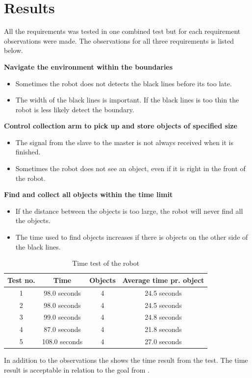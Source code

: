 \section{Results}

All the requirements was tested in one combined test but for each requirement observations were made. The observations for all three requirements is listed below.

\textbf{Navigate the environment within the boundaries}
\begin{itemize}
\item Sometimes the robot does not detects the black lines before its too late.
\item The width of the black lines is important. If the black lines is too thin the robot is less likely detect the boundary.
\end{itemize}

\textbf{Control collection arm to pick up and store objects of specified size}
\begin{itemize}
\item The signal from the slave to the master is not always received when it is finished.
\item Sometimes the robot does not see an object, even if it is right in the front of the robot.
\end{itemize}

\textbf{Find and collect all objects within the time limit}
\begin{itemize}
\item If the distance between the objects is too large, the robot will never find all the objects. 
\item The time used to find objects increases if there is objects on the other side of the black lines.  
\end{itemize}

\begin{table}[H]
	\centering
   \begin{tabular}{|c|c|c|c|}
   \hline  
   Test no. & Time & Objects & Average time pr. object \\ \hline
      1    & 98.0 seconds    & 4 & 24.5 seconds   \\ \hline
      2    & 98.0 seconds    & 4 & 24.5 seconds  \\ \hline
      3    & 99.0 seconds    & 4 & 24.8 seconds  \\ \hline
      4    & 87.0 seconds    & 4 & 21.8 seconds  \\ \hline
      5    & 108.0 seconds   & 4 & 27.0 seconds  \\ \hline
   \end{tabular}
   \caption{\label{table:FinalTimeTestRobot} Time test of the robot}
\end{table}

In addition to the observations the  shows the time result from the test. The time result is acceptable in relation to the goal from .





